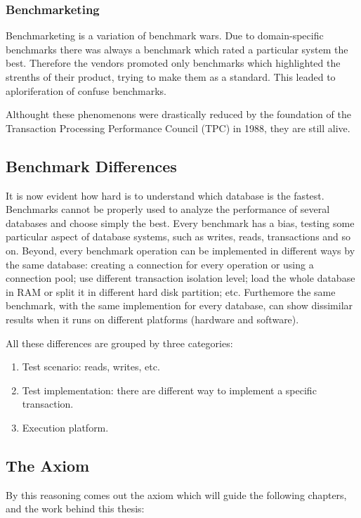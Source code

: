 		\subsubsection{Benchmarketing}
Benchmarketing is a variation of benchmark wars. Due to domain-specific benchmarks there was always a benchmark which rated a particular system the best. Therefore the vendors promoted only benchmarks which highlighted the strenths of their product, trying to make them as a standard. This leaded to aploriferation of confuse benchmarks.

		\vspace{0.5cm}
Althought these phenomenons were drastically reduced by the foundation of the Transaction Processing Performance Council (TPC) in 1988, they are still alive.

		\subsection{Benchmark Differences}
It is now evident how hard is to understand which database is the fastest. Benchmarks cannot be properly used to analyze the performance of several databases and choose simply the best. Every benchmark has a bias, testing some particular aspect of database systems, such as writes, reads, transactions and so on. Beyond, every benchmark operation can be implemented in different ways by the same database: creating a connection for every operation or using a connection pool; use different transaction isolation level; load the whole database in RAM or split it in different hard disk partition; etc. Furthemore the same benchmark, with the same implemention for every database, can show dissimilar results when it runs on different platforms (hardware and software).

All these differences are grouped by three categories:
\begin{enumerate}
	\item Test scenario: reads, writes, etc.
	\item Test implementation: there are different way to implement a specific transaction.
	\item Execution platform.
\end{enumerate}
	
		\subsection{The Axiom}
By this reasoning comes out the axiom which will guide the following chapters, and the work behind this thesis:

